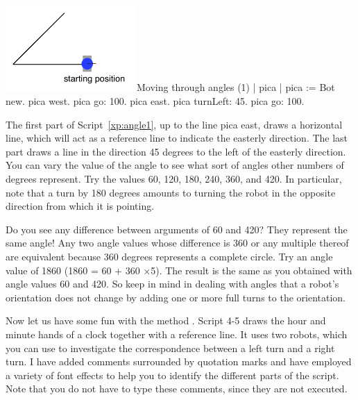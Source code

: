 \documentclass[a4paper,10pt,twoside]{book}
\begin{document}
\begin{scriptfigwithsize}[0.5]{\includegraphics[width=5cm]{ChTurnAngleSearchAnnotated}}{Moving through angles (1)}\label{xp:angle1}
	| pica | 
	pica := Bot new. 
	pica west. 
	pica go: 100. 
	pica east. 
	pica turnLeft: 45. 
	pica go: 100.
\end{scriptfigwithsize}



The first part of Script~\ref{xp:angle1}, up to the line pica east, draws a horizontal line, which will act 
as a reference line to indicate the easterly direction. The last part draws a line in the direction 
45 degrees to the left of the easterly direction. You can vary the value of the angle to see what 
sort of angles other numbers of degrees represent. Try the values 60, 120, 180, 240, 360, and 
420. In particular, note that a turn by 180 degrees amounts to turning the robot in the opposite 
direction from which it is pointing. 

Do you see any difference between arguments of 60 and 420? They represent the same angle! 
Any two angle values whose difference is 360 or any multiple thereof are equivalent because 360 
degrees represents a complete circle. Try an angle value of 1860 (1860 = 60 + 360 ×5). The result is 
the same as you obtained with angle values 60 and 420. So keep in mind in dealing with angles 
that a robot’s orientation does not change by adding one or more full turns to the orientation. 

Now let us have some fun with the method . Script 4-5 draws the hour and 
minute hands of a clock together with a reference line. It uses two robots, which you can use 
to investigate the correspondence between a left turn and a right turn. I have added comments 
surrounded by quotation marks and have employed a variety of font effects to help you to identify 
the different parts of the script. Note that you do not have to type these comments, since 
they are not executed. 
\end{document}
